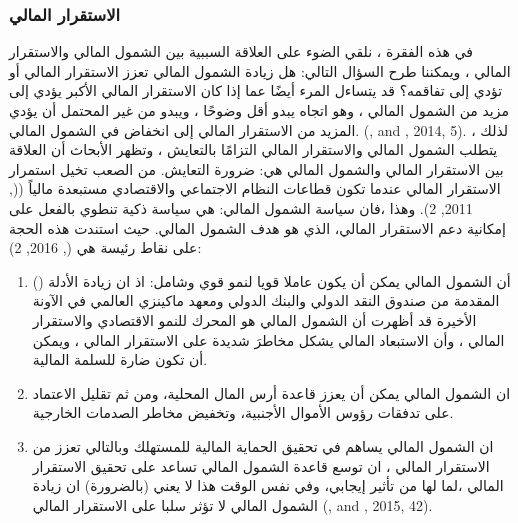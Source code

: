 \documentclass[10pt,a4paper]{report}
\begin{document}
\begin{doublespacing}
\subsubsection{الاستقرار المالي}
في هذه الفقرة ، نلقي الضوء على العلاقة السببية بين الشمول المالي والاستقرار المالي ، ويمكننا طرح السؤال التالي: هل زيادة الشمول المالي تعزز الاستقرار المالي أو تؤدي إلى تفاقمه؟ قد يتساءل المرء أيضًا عما إذا كان الاستقرار المالي الأكبر يؤدي إلى مزيد من الشمول المالي ، وهو اتجاه يبدو أقل وضوحًا ، ويبدو من غير المحتمل أن يؤدي المزيد من الاستقرار المالي إلى انخفاض في الشمول المالي. (, and , 2014, 5). لذلك ، يتطلب الشمول المالي والاستقرار المالي التزامًا بالتعايش ، وتظهر الأبحاث أن العلاقة بين الاستقرار المالي والشمول المالي هي: ضرورة التعايش. من الصعب تخيل استمرار الاستقرار المالي عندما تكون قطاعات النظام الاجتماعي والاقتصادي مستبعدة مالياً ((, 2011, 2). وهذا ،فان سياسة الشمول المالي: هي سياسة ذكية تنطوي بالفعل على إمكانية دعم الاستقرار المالي، الذي هو هدف الشمول المالي. حيث استندت هذه الحجة على نقاط رئيسة هي (, 2016, 2):
\begin{enumerate}[label=\alph*-]
	\item  أن الشمول المالي يمكن أن يكون عاملا قويا لنمو قوي وشامل: اذ ان زيادة الأدلة () المقدمة من صندوق النقد الدولي والبنك الدولي ومعهد ماكينزي العالمي في الآونة الأخيرة قد أظهرت أن الشمول المالي هو المحرك للنمو الاقتصادي والاستقرار المالي ، وأن الاستبعاد المالي يشكل مخاطرَ شديدة على الاستقرار المالي ، ويمكن أن تكون ضارة للسلمة المالية.
	
	\item  ان الشمول المالي يمكن أن يعزز قاعدة أرس المال المحلية، ومن ثم تقليل الاعتماد على تدفقات رؤوس الأموال الأجنبية، وتخفيض مخاطر الصدمات الخارجية.
	
	\item  ان الشمول المالي يساهم في تحقيق الحماية المالية للمستهلك وبالتالي تعزز من الاستقرار المالي ، ان توسع قاعدة الشمول المالي تساعد على تحقيق الاستقرار المالي ،لما لها من تأثير إيجابي، وفي نفس الوقت هذا لا يعني (بالضرورة) ان زيادة الشمول المالي لا تؤثر سلبا على الاستقرار المالي (, and , 2015, 42).
\end{enumerate}

\end{doublespacing}
\end{document}
